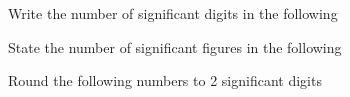 \documentclass[10pt, a4paper]{exam}
\begin{document}
\begin{multicols*}{2}
\begin{questions}
        \question Write the number of significant digits in the following
    
        
        \question State the number of significant figures in the following
    
        
        \question Round the following numbers to 2 significant digits
    
\end{questions}
\end{multicols*}
\end{document}
